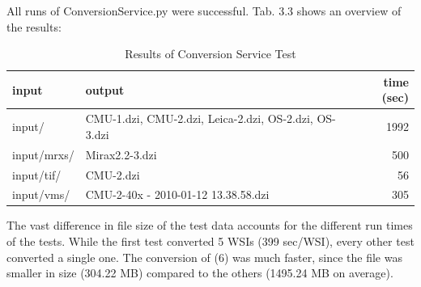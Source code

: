 All runs of ConversionService.py were successful. Tab. 3.3 shows an overview of the results:

\begin{table}[H]
	\begin{center}
		\begin{tabular}{| l | l | r |}
			\hline
			\textbf{input} & \textbf{output} & \textbf{time (sec)} \\ \hline
			input/ & CMU-1.dzi, CMU-2.dzi, Leica-2.dzi, OS-2.dzi, OS-3.dzi & 1992 \\ \hline
			input/mrxs/ & Mirax2.2-3.dzi & 500 \\ \hline
			input/tif/ & CMU-2.dzi & 56 \\ \hline
			input/vms/ & CMU-2-40x - 2010-01-12 13.38.58.dzi & 305 \\ \hline
		\end{tabular}
		\caption{Results of Conversion Service Test}
	\end{center}
\end{table}

The vast difference in file size of the test data accounts for the different run times of the tests. While the first test converted 5 WSIs (399 sec/WSI), every other test converted a single one. The conversion of (6) was much faster, since the file was smaller in size (304.22 MB) compared to the others (1495.24 MB on average).